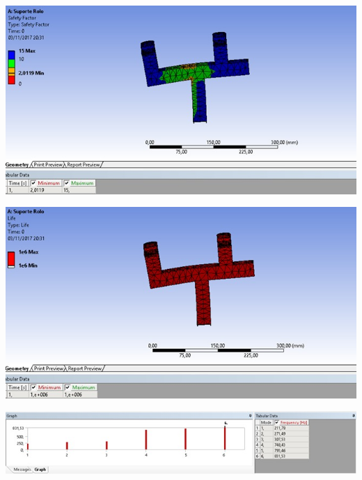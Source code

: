      \begin{center}
    	\includegraphics[scale=0.7]{figuras/fator_seguranca_5}
        \label{fator_seguranca_5}
    \end{center} 
    \begin{center}
    	\includegraphics[scale=0.7]{figuras/vida_util_5}
        \label{vida_util_5}
    \end{center} 
    \begin{center}
    	\includegraphics[scale=0.7]{figuras/vibracao_3}
        \label{vibracao_3}
    \end{center} 
 
